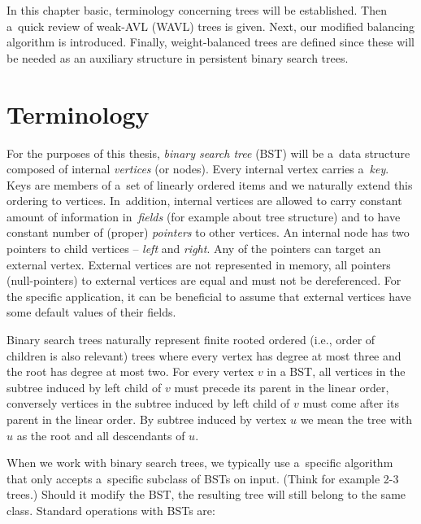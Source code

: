 In this chapter basic, terminology concerning trees will be established. Then a~quick review of weak-AVL (WAVL) trees is given. Next, our modified balancing algorithm is introduced. Finally, weight-balanced trees are defined since these will be needed as an auxiliary structure in persistent binary search trees.

\section{Terminology}

For the purposes of this thesis, \emph{binary search tree} (BST) will be a~data structure composed of internal \emph{vertices} (or nodes). Every internal vertex carries a~\emph{key}. Keys are members of a~set of linearly ordered items and we naturally extend this ordering to vertices. In~addition, internal vertices are allowed to carry constant amount of information in~\emph{fields} (for example about tree structure) and to have constant number of (proper) \emph{pointers} to other vertices. An internal node has two pointers to child vertices -- \emph{left} and \emph{right}. Any of the pointers can target an external vertex. 
External vertices are not represented in memory, all pointers (null-pointers) to external vertices are equal and must not be dereferenced. 
For the specific application, it can be beneficial to assume that external vertices have some default values of their fields. 

Binary search trees naturally represent finite rooted ordered (i.e., order of children is also relevant) trees where every vertex has degree at most three and the root has degree at most two. 
For every vertex $v$ in a BST, all vertices in the subtree induced by left child of $v$ must precede its parent in the linear order, conversely vertices in the subtree induced by left child of $v$ must come after its parent in the linear order. By subtree induced by vertex $u$ we mean the tree with $u$ as the root and all descendants of $u$.

When we work with binary search trees, we typically use a~specific algorithm that only accepts a~specific subclass of BSTs on input. (Think for example 2-3 trees.) Should it modify the BST, the resulting tree will still belong to the same class. Standard operations with BSTs are:

